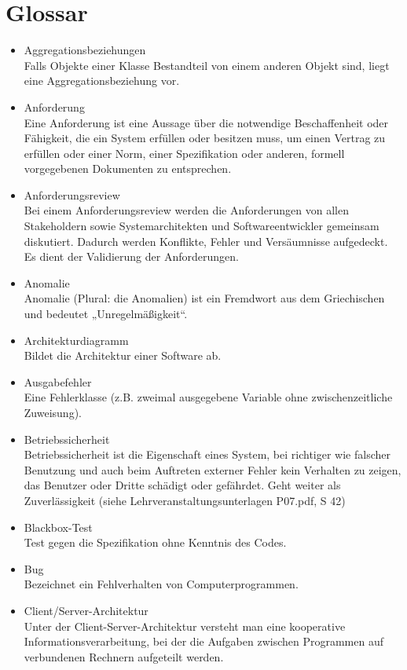 \chapter{Glossar}
\begin{itemize}
\item 	Aggregationsbeziehungen\\
Falls Objekte einer Klasse Bestandteil von einem anderen Objekt sind, liegt eine Aggregationsbeziehung vor.
\item 	Anforderung\\
Eine Anforderung ist eine Aussage über die notwendige Beschaffenheit oder Fähigkeit, die ein System erfüllen oder besitzen muss, um einen Vertrag zu erfüllen oder einer Norm, einer Spezifikation oder anderen, formell vorgegebenen Dokumenten zu entsprechen.
\item 	Anforderungsreview\\
Bei einem Anforderungsreview werden die Anforderungen von allen Stakeholdern sowie Systemarchitekten und Softwareentwickler gemeinsam diskutiert. Dadurch werden Konflikte, Fehler und Versäumnisse aufgedeckt. Es dient der Validierung der Anforderungen.
\item Anomalie \\ Anomalie (Plural: die Anomalien) ist ein Fremdwort aus dem Griechischen und bedeutet „Unregelmäßigkeit“.
\item 	Architekturdiagramm\\
Bildet die Architektur einer Software ab.
\item Ausgabefehler \\ Eine Fehlerklasse (z.B. zweimal ausgegebene Variable ohne zwischenzeitliche Zuweisung).
\item 	Betriebssicherheit \\ Betriebssicherheit ist die Eigenschaft eines System, bei richtiger wie falscher Benutzung und auch beim Auftreten externer Fehler kein Verhalten zu zeigen, das Benutzer oder Dritte schädigt oder  gefährdet. Geht weiter als Zuverlässigkeit (siehe Lehrveranstaltungsunterlagen P07.pdf, S 42)
\item 	Blackbox-Test\\
Test gegen die Spezifikation ohne Kenntnis des Codes.
\item 	Bug\\
Bezeichnet ein Fehlverhalten von Computerprogrammen.
\item 	Client/Server-Architektur\\
Unter der Client-Server-Architektur versteht man eine kooperative Informationsverarbeitung, bei der die Aufgaben zwischen Programmen auf verbundenen Rechnern aufgeteilt werden.

\end{itemize}
